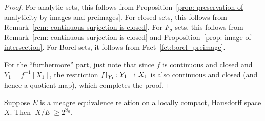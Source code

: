 	\begin{proof}
		For analytic sets, this follows from Proposition~\ref{prop: preservation of analyticity by images and preimages}. For closed sets, this follows from Remark~\ref{rem: continuous surjection is closed}. For $F_\sigma$ sets, this follows from Remark~\ref{rem: continuous surjection is closed} and Proposition~\ref{prop: image of intersection}. For Borel sets, it follows from Fact~\ref{fct:borel_preimage}.
		
		For the ``furthermore'' part, just note that since $f$ is continuous and closed and $Y_1=f^{-1}[X_1]$, the restriction $f\mathord{\upharpoonright}_{Y_1}\colon Y_1\to X_1$ is also continuous and closed (and hence a quotient map), which completes the proof.
	\end{proof}
	
	
	\begin{prop}
		\label{prop:mycielski}
		Suppose $E$ is a meagre equivalence relation on a locally compact, Hausdorff space $X$. Then $\lvert X/E\rvert \geq 2^{\aleph_0}$.
	\end{prop}
